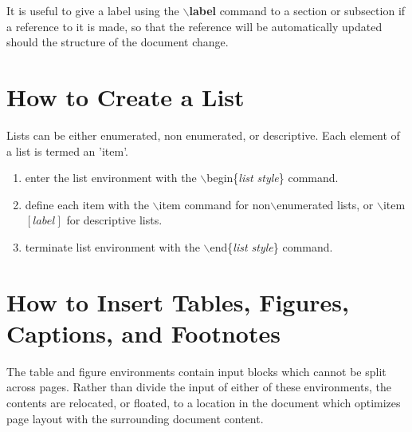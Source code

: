 It is useful to give a label using the \textbf{$\backslash$label} command to a section or subsection if a reference to it is made, so that the reference will be automatically updated should the structure of the document change.

\section{How to Create a List}
 Lists can be either enumerated, non enumerated, or descriptive. Each element of a list is termed an 'item'.

 \begin{enumerate}
    \item enter the list environment with the $\backslash$begin\{\textit{list style}\} command.
    \vspace{-2mm}
    \item define each item with the $\backslash$item command for non$\backslash$enumerated lists, or $\backslash$item$[\textit{label}]$ for descriptive lists.
    \vspace{-2mm}
    \item terminate list environment with the $\backslash$end\{\textit{list style}\} command.
 \end{enumerate}

\section{How to Insert Tables, Figures, Captions, and Footnotes}
 The table and figure environments contain input blocks which cannot be split across pages.  Rather than divide the input of either of these
 environments, the contents are relocated, or floated, to a location in the document which optimizes page layout with the surrounding document content.

